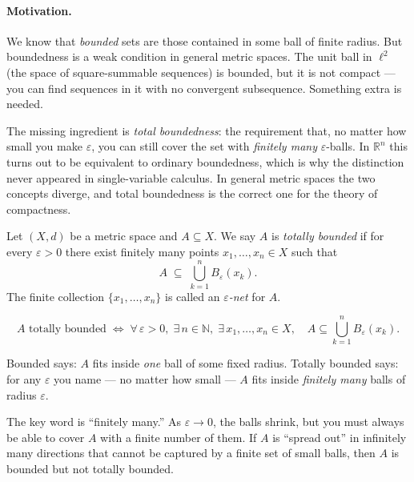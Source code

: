 \paragraph{Motivation.}
We know that \emph{bounded} sets are those contained in some ball of
finite radius.
But boundedness is a weak condition in general metric spaces.
The unit ball in $\ell^2$ (the space of square-summable sequences)
is bounded, but it is not compact --- you can find sequences
in it with no convergent subsequence.
Something extra is needed.

The missing ingredient is \emph{total boundedness}: the requirement
that, no matter how small you make $\varepsilon$, you can still cover
the set with \emph{finitely many} $\varepsilon$-balls.
In $\mathbb{R}^n$ this turns out to be equivalent to ordinary boundedness,
which is why the distinction never appeared in single-variable calculus.
In general metric spaces the two concepts diverge, and total boundedness
is the correct one for the theory of compactness.

\begin{tcolorbox}[colback=propbox, colframe=propborder, arc=2pt,
  left=6pt, right=6pt, top=4pt, bottom=4pt,
  title={\small\textbf{Definition (Totally Bounded Set)}},
  fonttitle=\small\bfseries]
\begin{definition}
\label{def:totally-bounded}
Let $(X, d)$ be a metric space and $A \subseteq X$.
We say $A$ is \emph{totally bounded} if for every $\varepsilon > 0$ there
exist finitely many points $x_1, \ldots, x_n \in X$ such that
\[
A \;\subseteq\; \bigcup_{k=1}^n B_\varepsilon(x_k).
\]
The finite collection $\{x_1, \ldots, x_n\}$ is called an
\emph{$\varepsilon$-net} for $A$.
\end{definition}
\end{tcolorbox}

\begin{remark*}
\[
A \text{ totally bounded}
\;\iff\;
\forall\,\varepsilon > 0,\;
\exists\, n \in \mathbb{N},\;
\exists\, x_1, \ldots, x_n \in X,\quad
A \subseteq \bigcup_{k=1}^n B_\varepsilon(x_k).
\]
\end{remark*}

\begin{remark*}
Bounded says: $A$ fits inside \emph{one} ball of some fixed radius.
Totally bounded says: for any $\varepsilon$ you name --- no matter how
small --- $A$ fits inside \emph{finitely many} balls of radius $\varepsilon$.

The key word is ``finitely many.''
As $\varepsilon \to 0$, the balls shrink, but you must always be able to
cover $A$ with a finite number of them.
If $A$ is ``spread out'' in infinitely many directions that cannot be
captured by a finite set of small balls, then $A$ is bounded but not
totally bounded.
\end{remark*}

